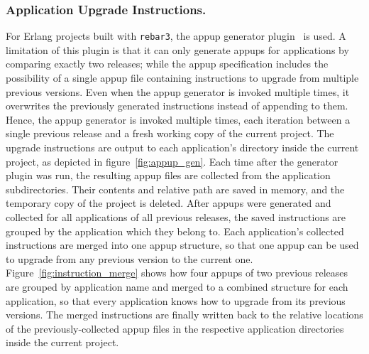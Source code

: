 {\subsubsection{Application Upgrade Instructions.} For Erlang projects built with \lstinline|rebar3|, the \acrlong{appup} generator plugin~\cite{rebar3appup} is used. A limitation of this plugin is that it can only generate \acrshort{appup}s for applications by comparing exactly two releases; while the \acrshort{appup} specification includes the possibility of a single \acrshort{appup} file containing instructions to upgrade from multiple previous versions. Even when the \acrshort{appup} generator is invoked multiple times, it overwrites the previously generated instructions instead of appending to them. Hence, the \acrshort{appup} generator is invoked multiple times, each iteration between a single previous release and a fresh working copy of the current project. The upgrade instructions are output to each application's directory inside the current project, as depicted in figure~\ref{fig:appup_gen}. Each time after the generator plugin was run, the resulting \acrshort{appup} files are collected from the application subdirectories. Their contents and relative path are saved in memory, and the temporary copy of the project is deleted. After \acrshort{appup}s were generated and collected for all applications of all previous releases, the saved instructions are grouped by the application which they belong to. Each application's collected instructions are merged into one \acrshort{appup} structure, so that one \acrshort{appup} can be used to upgrade from any previous version to the current one. Figure~\ref{fig:instruction_merge} shows how four \acrshort{appup}s of two previous releases are grouped by application name and merged to a combined structure for each application, so that every application knows how to upgrade from its previous versions. The merged instructions are finally written back to the relative locations of the previously-collected \acrshort{appup} files in the respective application directories inside the current project.

\cleardoublepage

}
